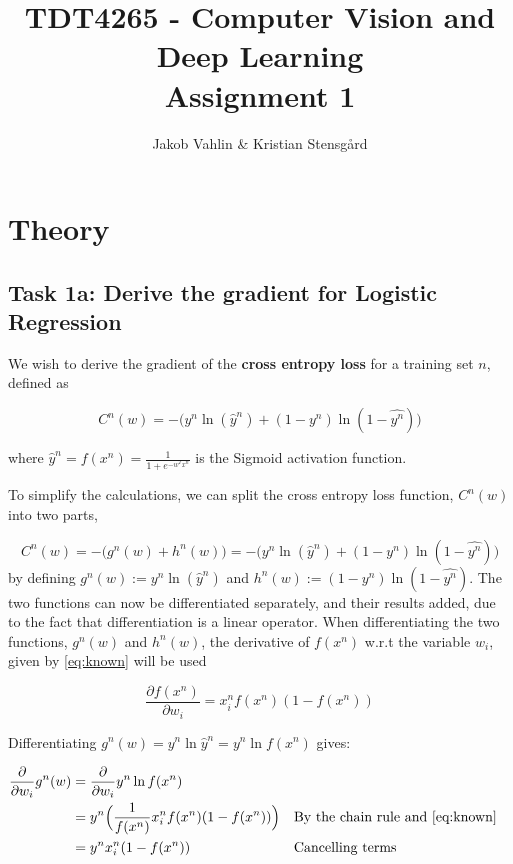 \documentclass{article}
\date{}
\title{TDT4265 - Computer Vision and Deep Learning \\Assignment 1}
\author{Jakob Vahlin & Kristian Stensgård}
\begin{document}
\maketitle

\tableofcontents
\newpage

\section{Theory}
\subsection{Task 1a: Derive the gradient for Logistic Regression}

\noindent We wish to derive the gradient of the \textbf{cross entropy loss} for a training set $n$, defined as

\begin{equation}
    C^n(w) = -\big(y^n \ln{(\hat{y}^n)} + (1-y^n) \ln{(1-\hat{y^n})}\big)
\end{equation}

\noindent where $\hat{y}^n = f(x^n) = \frac{1}{1+ e^{-w^T x^n}}$ is the Sigmoid activation function.


\noindent To simplify the calculations, we can split the cross entropy loss function, $C^n(w)$ into two parts,

\begin{equation}
    C^n(w) = -\big(g^n(w) + h^n(w)\big) = -\big(y^n \ln{(\hat{y}^n)} + (1-y^n) \ln{(1-\hat{y^n})}\big)
\end{equation}
\noindent by defining $g^n(w) := y^n \ln{(\hat{y}^n)}$ and $h^n(w) := (1-y^n) \ln{(1-\hat{y^n})}$. The two functions can now be differentiated separately, and their results added, due to the fact that differentiation is a linear operator. When differentiating the two functions, $g^n(w)$ and $h^n(w)$, the derivative of $f(x^n)$ w.r.t the variable $w_i$, given by \eqref{eq:known}  will be used

\begin{equation}
    \frac{\partial f\left(x^{n}\right)}{\partial w_{i}}=x_{i}^{n} f\left(x^{n}\right)\left(1-f\left(x^{n}\right)\right)
    \label{eq:known}
\end{equation}

Differentiating $g^n(w) = y^n\ln{\hat{y}^n} = y^n\ln{f(x^n)}$ gives:

\begin{align}
    \frac{\partial}{\partial w_i} g^n(w) &= \frac{\partial}{\partial w_i} y^n \ln{f(x^n)} \\
    &= y^n \Big(\frac{1}{f(x^n)} x_i^n f(x^n)(1-f(x^n))\Big) && \text{By the chain rule and \eqref{eq:known}} \\
    &= y^n x_i^n (1-f(x^n)) && \text{Cancelling terms}\label{eq:result1}
\end{align}
\end{document}
